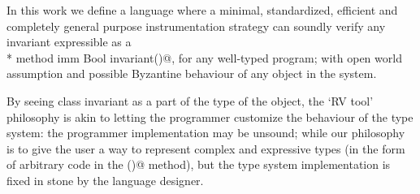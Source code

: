 In this work we define a language where a minimal, standardized,
efficient and completely general purpose instrumentation strategy can soundly verify any invariant
expressible as a\\* \Q@read method imm Bool invariant()@, for any well-typed program; with open world assumption
and possible Byzantine behaviour of any object in the system.

By seeing class invariant as a part of the type of the object,
the `RV tool' philosophy is akin to letting the programmer customize the behaviour of the
type system: the programmer implementation may be unsound; while our philosophy is
to give the user a way to represent complex and expressive types (in the form of arbitrary code in 
the \Q@invariant()@ method), but 
the type system implementation is fixed in stone by the language designer.

\newcommand\sepItems{\saveSpace\saveSpace\saveSpace\\*${}_{}$\\*$\bullet\,$}

